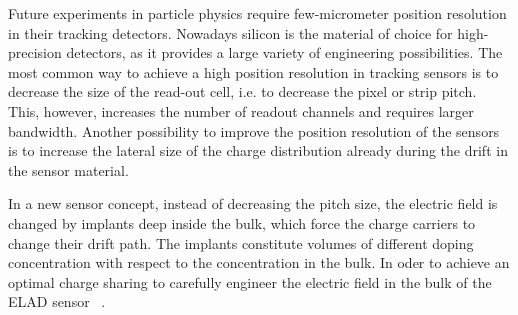 
Future experiments in particle physics require few-micrometer position resolution in their tracking detectors. 
Nowadays silicon is the material of choice for high-precision detectors, as it provides a large variety of engineering possibilities. 
The most common way to achieve a high position resolution in tracking sensors is to decrease the size of the read-out cell, i.e. to decrease the pixel or strip pitch. 
This, however, increases the number of readout channels and requires larger bandwidth. 
Another possibility to improve the position resolution of the sensors is to increase the lateral size of the charge distribution already during the drift in the sensor material. 

In a new sensor concept, instead of decreasing the pitch size, the electric field is changed by implants deep inside the bulk, which force the charge carriers to change their drift path. 
The implants constitute volumes of different doping concentration with respect to the concentration in the bulk. 
In oder to achieve an optimal charge sharing to carefully engineer the electric field in the bulk of the ELAD sensor ~\cite{JANSEN2016242}.
